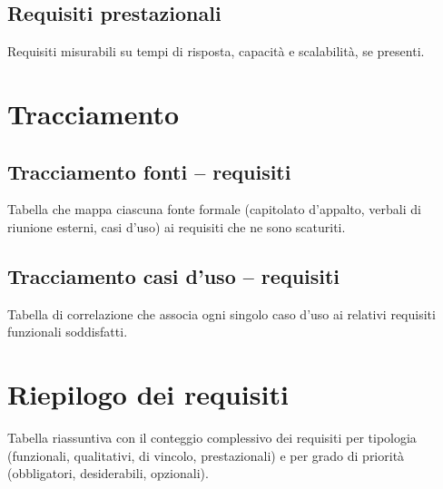 \documentclass[11pt, a4paper]{article}
\begin{document}
\subsection{Requisiti prestazionali}
Requisiti misurabili su tempi di risposta, capacità e scalabilità, se presenti.

\newpage


\section{Tracciamento}

\subsection{Tracciamento fonti -- requisiti}
Tabella che mappa ciascuna fonte formale (capitolato d'appalto, verbali di riunione esterni, casi d'uso) ai requisiti che ne sono scaturiti.

\subsection{Tracciamento casi d'uso -- requisiti}
Tabella di correlazione che associa ogni singolo caso d'uso ai relativi requisiti funzionali soddisfatti.


\section{Riepilogo dei requisiti}
Tabella riassuntiva con il conteggio complessivo dei requisiti per tipologia (funzionali, qualitativi, di vincolo, prestazionali) e per grado di priorità (obbligatori, desiderabili, opzionali).
\end{document}
